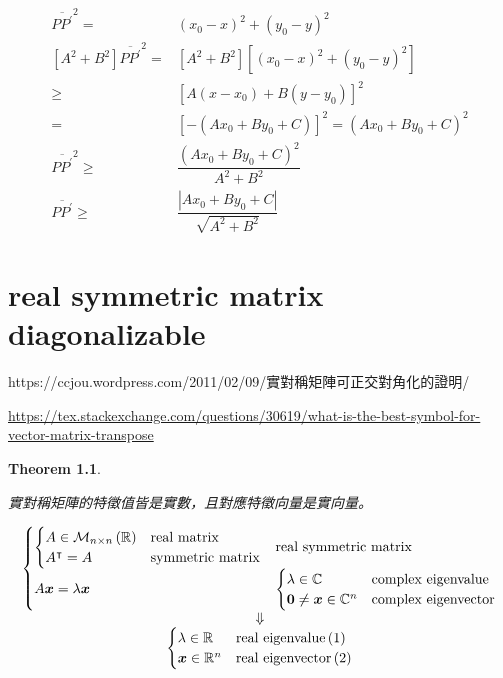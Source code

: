 \documentclass[
]{book}
\newtheorem{theorem}{Theorem}[chapter]
\theoremstyle{definition}
\theoremstyle{definition}
\theoremstyle{definition}
\theoremstyle{definition}
\theoremstyle{remark}
\begin{document}
\[
\begin{aligned}
\overline{PP^{\prime}}^{2}= & \left(x_{0}-x\right)^{2}+\left(y_{0}-y\right)^{2}\\
\left[A^{2}+B^{2}\right]\overline{PP^{\prime}}^{2}= & \left[A^{2}+B^{2}\right]\left[\left(x_{0}-x\right)^{2}+\left(y_{0}-y\right)^{2}\right]\\
\ge & \left[A\left(x-x_{0}\right)+B\left(y-y_{0}\right)\right]^{2}\\
= & \left[-\left(Ax_{0}+By_{0}+C\right)\right]^{2}=\left(Ax_{0}+By_{0}+C\right)^{2}\\
\overline{PP^{\prime}}^{2}\ge & \dfrac{\left(Ax_{0}+By_{0}+C\right)^{2}}{A^{2}+B^{2}}\\
\overline{PP^{\prime}}\ge & \dfrac{\left|Ax_{0}+By_{0}+C\right|}{\sqrt{A^{2}+B^{2}}}
\end{aligned}
\]

\chapter{real symmetric matrix diagonalizable}\label{real-symmetric-matrix-diagonalizable}

\begin{CJK}{UTF8}{bsmi}
https://ccjou.wordpress.com/2011/02/09/實對稱矩陣可正交對角化的證明/
\end{CJK}

\url{https://tex.stackexchange.com/questions/30619/what-is-the-best-symbol-for-vector-matrix-transpose}

\begin{theorem}
\protect\hypertarget{thm:real-sym-real-eigen}{}\label{thm:real-sym-real-eigen}\leavevmode

\begin{CJK}{UTF8}{bsmi}
實對稱矩陣的特徵值皆是實數，且對應特徵向量是實向量。
\end{CJK}

\[
\begin{array}{c}
\begin{cases}
\begin{cases}
A\in\mathcal{M}_{n\times n}\left(\mathbb{R}\right) & \textup{real matrix}\\
A^{\intercal}=A & \textup{symmetric matrix}
\end{cases} & \textup{real symmetric matrix}\\
A\boldsymbol{x}=\lambda\boldsymbol{x} & \begin{cases}
\lambda\in\mathbb{C} & \textup{complex eigenvalue}\\
\boldsymbol{0}\ne\boldsymbol{x}\in\mathbb{C}^{n} & \textup{complex eigenvector}
\end{cases}
\end{cases}\\
\Downarrow\\
\begin{cases}
\lambda\in\mathbb{R} & \textup{real eigenvalue}\left(1\right)\\
\boldsymbol{x}\in\mathbb{R}^{n} & \textup{real eigenvector}\left(2\right)
\end{cases}
\end{array}
\]

\end{theorem}
\end{document}
